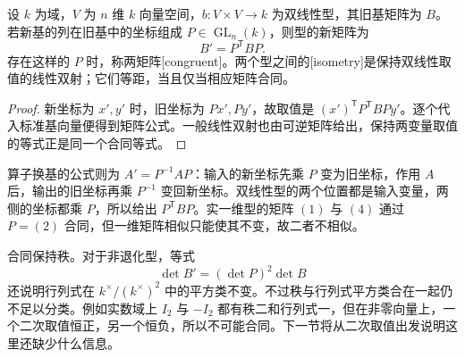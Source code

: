 \begin{proposition}\label{b2:prop:bilinear-congruence}
	设 \(k\) 为域，\(V\) 为 \(n\) 维 \(k\) 向量空间，\(b:V\times V\to k\) 为双线性型，其旧基矩阵为 \(B\)。若新基的列在旧基中的坐标组成 \(P\in\operatorname{GL}_n(k)\)，则型的新矩阵为
	\[
		B'=P^{\mathsf T}BP.
	\]
	存在这样的 \(P\) 时，称两矩阵[congruent]。两个型之间的[isometry]是保持双线性取值的线性双射；它们等距，当且仅当相应矩阵合同。
\end{proposition}
\begin{proof}
	新坐标为 \(x',y'\) 时，旧坐标为 \(Px',Py'\)，故取值是 \((x')^{\mathsf T}P^{\mathsf T}BPy'\)。逐个代入标准基向量便得到矩阵公式。一般线性双射也由可逆矩阵给出，保持两变量取值的等式正是同一个合同等式。
\end{proof}

算子换基的公式则为 \(A'=P^{-1}AP\)：输入的新坐标先乘 \(P\) 变为旧坐标，作用 \(A\) 后，输出的旧坐标再乘 \(P^{-1}\) 变回新坐标。双线性型的两个位置都是输入变量，两侧的坐标都乘 \(P\)，所以给出 \(P^{\mathsf T}BP\)。实一维型的矩阵 \((1)\) 与 \((4)\) 通过 \(P=(2)\) 合同，但一维矩阵相似只能使其不变，故二者不相似。

\ProseParagraphBreak
合同保持秩。对于非退化型，等式
\[
	\det B'=(\det P)^2\det B
\]
还说明行列式在 \(k^\times/(k^\times)^2\) 中的平方类不变。不过秩与行列式平方类合在一起仍不足以分类。例如实数域上 \(I_2\) 与 \(-I_2\) 都有秩二和行列式一，但在非零向量上，一个二次取值恒正，另一个恒负，所以不可能合同。下一节将从二次取值出发说明这里还缺少什么信息。
